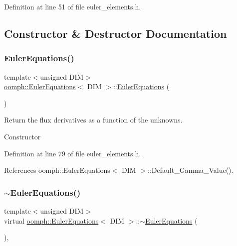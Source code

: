 Definition at line 51 of file euler\+\_\+elements.\+h.



\subsection{Constructor \& Destructor Documentation}
\mbox{\label{classoomph_1_1EulerEquations_af24bad78c998c9d476c6bf0753af4ced}} 
\subsubsection{\texorpdfstring{Euler\+Equations()}{EulerEquations()}}
{\footnotesize\ttfamily template$<$unsigned D\+IM$>$ \\
\hyperlink{classoomph_1_1EulerEquations}{oomph\+::\+Euler\+Equations}$<$ D\+IM $>$\+::\hyperlink{classoomph_1_1EulerEquations}{Euler\+Equations} (\begin{DoxyParamCaption}{ }\end{DoxyParamCaption})\hspace{0.3cm}{\ttfamily [inline]}}



Return the flux derivatives as a function of the unknowns. 

Constructor 

Definition at line 79 of file euler\+\_\+elements.\+h.



References oomph\+::\+Euler\+Equations$<$ D\+I\+M $>$\+::\+Default\+\_\+\+Gamma\+\_\+\+Value().

\mbox{\label{classoomph_1_1EulerEquations_a0c60500b3b841a4065b588b55e6dfc49}} 
\subsubsection{\texorpdfstring{$\sim$\+Euler\+Equations()}{~EulerEquations()}}
{\footnotesize\ttfamily template$<$unsigned D\+IM$>$ \\
virtual \hyperlink{classoomph_1_1EulerEquations}{oomph\+::\+Euler\+Equations}$<$ D\+IM $>$\+::$\sim$\hyperlink{classoomph_1_1EulerEquations}{Euler\+Equations} (\begin{DoxyParamCaption}{ }\end{DoxyParamCaption})\hspace{0.3cm}{\ttfamily [inline]}, {\ttfamily [virtual]}}




